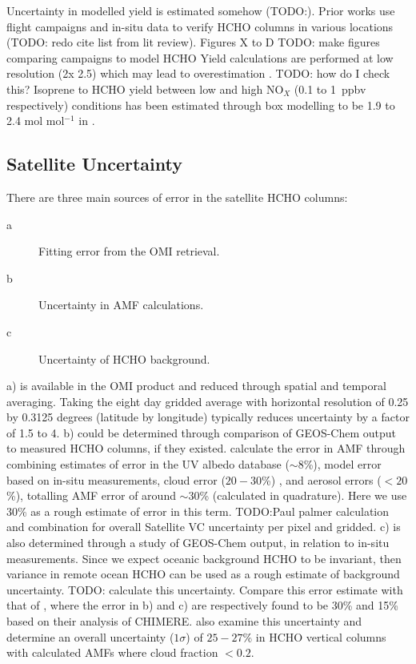     
    Uncertainty in modelled yield is estimated somehow (TODO:).
    Prior works use flight campaigns and in-situ data to verify HCHO columns in various locations (TODO: redo cite list from lit review).
    Figures X to D TODO: make figures comparing campaigns to model HCHO
    Yield calculations are performed at low resolution (2\degr x 2.5\degr) which may lead to overestimation \parencite{Yu2016}.
    TODO: how do I check this?
    Isoprene to HCHO yield between low and high NO$_X$ (0.1 to 1~ppbv respectively) conditions has been estimated through box modelling to be 1.9 to 2.4 mol mol$^{-1}$ in \textcite{Bauwens2016}.
    
  \subsection{Satellite Uncertainty}
    \label{BioIsop:Uncertianty:Satellite}
    
    There are three main sources of error in the satellite HCHO columns:
    \begin{description}
      \item[a] Fitting error from the OMI retrieval.
      \item[b] Uncertainty in AMF calculations.
      \item[c] Uncertainty of HCHO background.
    \end{description}
    a) is available in the OMI product and reduced through spatial and temporal averaging.
    Taking the eight day gridded average with horizontal resolution of 0.25 by 0.3125 degrees (latitude by longitude) typically reduces uncertainty by a factor of 1.5 to 4.
    b) could be determined through comparison of GEOS-Chem output to measured HCHO columns, if they existed.
    \textcite{Palmer2006} calculate the error in AMF through combining estimates of error in the UV albedo database ($\sim 8$\%), model error based on in-situ measurements, cloud error  ($20-30$\%) \parencite{Martin2003}, and aerosol errors ($<20$\%), totalling AMF error of around $\sim 30$\% (calculated in quadrature).
    Here we use 30\% as a rough estimate of error in this term.
    TODO:Paul palmer calculation and combination for overall Satellite VC uncertainty per pixel and gridded.
    c) is also determined through a study of GEOS-Chem output, in relation to in-situ measurements. 
    Since we expect oceanic background HCHO to be invariant, then variance in remote ocean HCHO can be used as a rough estimate of background uncertainty.
    TODO: calculate this uncertainty.
    Compare this error estimate with that of \textcite{Curci2010}, where the error in b) and c) are respectively found to be 30\% and 15\% based on their analysis of CHIMERE.
    \textcite{Millet2008} also examine this uncertainty and determine an overall uncertainty ($1\sigma$) of $25-27\%$ in HCHO vertical columns with calculated AMFs where cloud fraction $< 0.2$.
    
